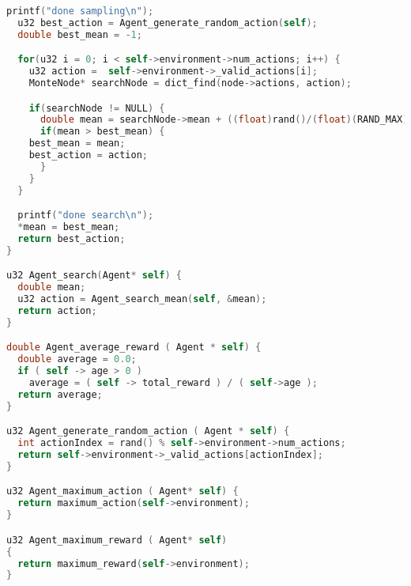 \documentclass[fancychapters]{report}   	%
\begin{document}
\begin{lstlisting}[language=C,caption={agent.c}]
  printf("done sampling\n");
  u32 best_action = Agent_generate_random_action(self);
  double best_mean = -1;

  for(u32 i = 0; i < self->environment->num_actions; i++) {
    u32 action =  self->environment->_valid_actions[i];
    MonteNode* searchNode = dict_find(node->actions, action);

    if(searchNode != NULL) {
      double mean = searchNode->mean + ((float)rand()/(float)(RAND_MAX)) * 0.0001;
      if(mean > best_mean) {
	best_mean = mean;
	best_action = action;
      }
    }
  }

  printf("done search\n");
  *mean = best_mean;
  return best_action;
}

u32 Agent_search(Agent* self) {
  double mean;
  u32 action = Agent_search_mean(self, &mean);
  return action;
}

double Agent_average_reward ( Agent * self) {
  double average = 0.0;
  if ( self -> age > 0 )
    average = ( self -> total_reward ) / ( self->age );
  return average;
}

u32 Agent_generate_random_action ( Agent * self) {
  int actionIndex = rand() % self->environment->num_actions;
  return self->environment->_valid_actions[actionIndex];
}

u32 Agent_maximum_action ( Agent* self) {
  return maximum_action(self->environment);
}

u32 Agent_maximum_reward ( Agent* self)
{
  return maximum_reward(self->environment);
}
\end{lstlisting}
\end{document}
